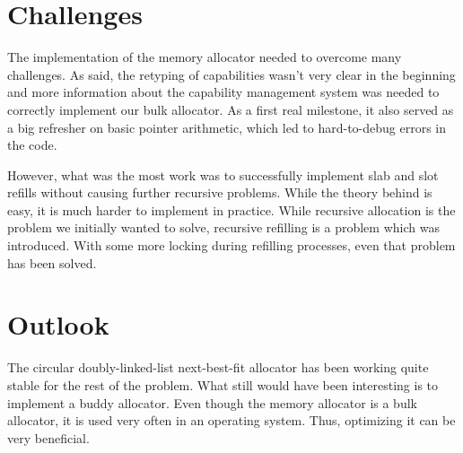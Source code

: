 \section{Challenges}

The implementation of the memory allocator needed to overcome many
challenges. As said, the retyping of capabilities wasn't very clear in the beginning
and more information about the capability management system was needed to correctly
implement our bulk allocator. As a first real milestone, it also served as a
big refresher on basic pointer arithmetic, which led to hard-to-debug errors in the code.

However, what was the most work was to successfully implement slab and slot refills
without causing further recursive problems. While the theory behind is easy, it is much harder
to implement in practice. While recursive allocation is the problem we initially wanted
to solve, recursive refilling is a problem which was introduced. With some more locking
during refilling processes, even that problem has been solved.

\section{Outlook}

The circular doubly-linked-list next-best-fit allocator has been working quite stable
for the rest of the problem. What still would have been interesting is to implement
a buddy allocator. Even though the memory allocator is a bulk allocator, it is used very often in an operating system. Thus, optimizing it can be very beneficial.